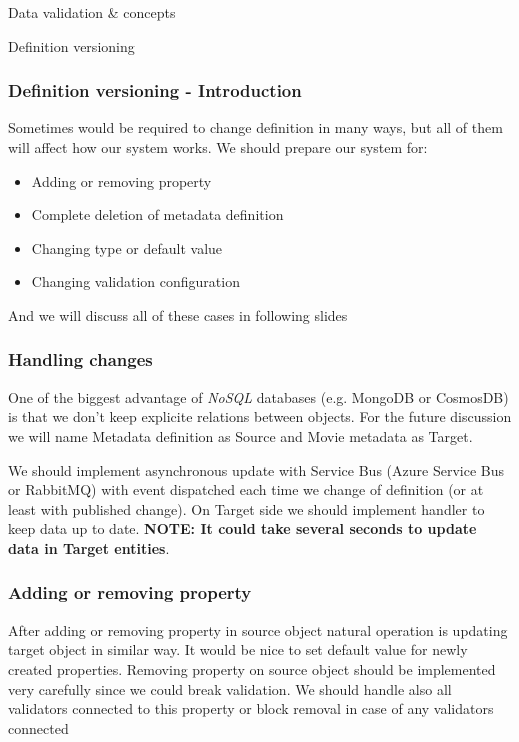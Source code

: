 \documentclass{beamer}
\begin{document}
\begin{section}{Data validation \& concepts}
\end{section}

\begin{section}{Definition versioning}

\begin{frame}
\frametitle{Definition versioning - Introduction}
Sometimes would be required to change definition in many ways, but all of them will affect how our system works. We should prepare our system for: 
\pause
\begin{itemize}
	\item Adding or removing property \pause
	\item Complete deletion of metadata definition \pause
	\item Changing type or default value \pause
	\item Changing validation configuration \pause
\end{itemize}
And we will discuss all of these cases in following slides
\end{frame}

\begin{frame}
\frametitle{Handling changes}
One of the biggest advantage of \textit{NoSQL} databases (e.g. MongoDB or CosmosDB) is that we don't keep explicite relations between objects. For the future discussion we will name Metadata definition as Source and Movie metadata as Target. \newline \newline

We should implement asynchronous update with Service Bus (Azure Service Bus or RabbitMQ) with event dispatched each time we change of definition (or at least with published change). On Target side we should implement handler to keep data up to date. \pause  \newline\textbf{NOTE: It could take several seconds to update data in Target entities}.

\end{frame}

\begin{frame}
\frametitle{Adding or removing property}
After adding or removing property in source object natural operation is updating target object in similar way.
\newline
It would be nice to set default value for newly created properties.
\newline
Removing property on source object should be implemented very carefully since we could break validation. We should handle also all validators connected to this property or block removal in case of any validators connected
\end{frame}


\end{section}
\end{document}
